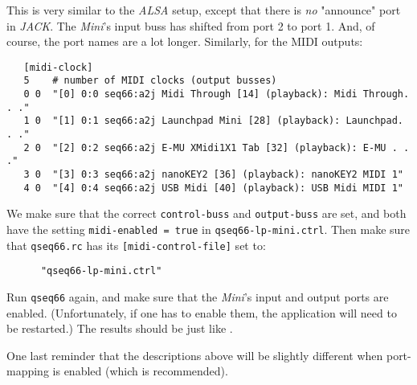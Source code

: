    This is very similar to the \textsl{ALSA} setup, except that there is
   \textsl{no}
   "announce" port in \textsl{JACK}.
   The \textsl{Mini}'s input buss has shifted from
   port 2 to port 1.  And, of course, the port names are a lot
   longer.  Similarly, for the MIDI outputs:

   \begin{verbatim}
   [midi-clock]
   5    # number of MIDI clocks (output busses)
   0 0  "[0] 0:0 seq66:a2j Midi Through [14] (playback): Midi Through. . ."
   1 0  "[1] 0:1 seq66:a2j Launchpad Mini [28] (playback): Launchpad. . ."
   2 0  "[2] 0:2 seq66:a2j E-MU XMidi1X1 Tab [32] (playback): E-MU . . ."
   3 0  "[3] 0:3 seq66:a2j nanoKEY2 [36] (playback): nanoKEY2 MIDI 1"
   4 0  "[4] 0:4 seq66:a2j USB Midi [40] (playback): USB Midi MIDI 1"
   \end{verbatim}

   We make sure that the correct \texttt{control-buss} and
   \texttt{output-buss} are set, and both have the setting
   \texttt{midi-enabled = true} in \texttt{qseq66-lp-mini.ctrl}.
   Then make sure that \texttt{qseq66.rc} has its
   \texttt{[midi-control-file]} set to:

   \begin{verbatim}
      "qseq66-lp-mini.ctrl"
   \end{verbatim}

   Run \texttt{qseq66} again, and make sure that the \textsl{Mini}'s
   input and output
   ports are enabled. (Unfortunately, if one has to enable them, the
   application will need to be restarted.)
   The results should be just like
   .

   One last reminder that the descriptions above will be slightly
   different when port-mapping is enabled (which is recommended).


